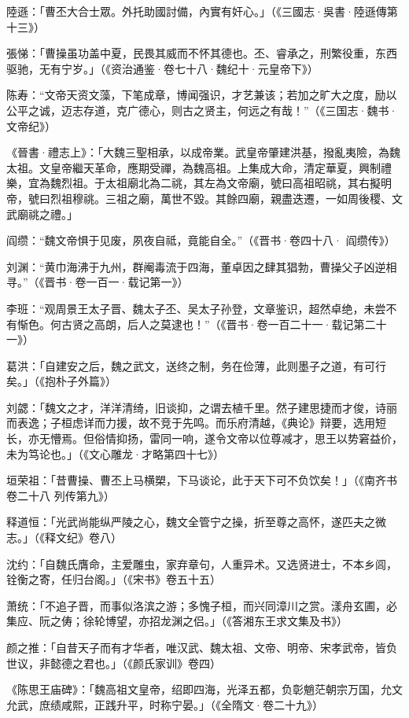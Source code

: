 陸遜：「曹丕大合士眾。外托助國討備，內實有奸心。」（《三國志·吳書·陸遜傳第十三》）

張悌：「曹操虽功盖中夏，民畏其威而不怀其德也。丕、睿承之，刑繁役重，东西驱驰，无有宁岁。」（《资治通鉴·卷七十八·魏纪十·元皇帝下》）

陈寿：“文帝天资文藻，下笔成章，博闻强识，才艺兼该；若加之旷大之度，励以公平之诚，迈志存道，克广德心，则古之贤主，何远之有哉！”（《三国志·魏书·文帝纪》）

《晉書·禮志上》：「大魏三聖相承，以成帝業。武皇帝肇建洪基，撥亂夷險，為魏太祖。文皇帝繼天革命，應期受禪，為魏高祖。上集成大命，清定華夏，興制禮樂，宜為魏烈祖。于太祖廟北為二祧，其左為文帝廟，號曰高祖昭祧，其右擬明帝，號曰烈祖穆祧。三祖之廟，萬世不毀。其餘四廟，親盡迭遷，一如周後稷、文武廟祧之禮。」

阎缵：“魏文帝惧于见废，夙夜自祗，竟能自全。”（《晋书·卷四十八· 阎缵传》）

刘渊：“黄巾海沸于九州，群阉毒流于四海，董卓因之肆其猖勃，曹操父子凶逆相寻。”（《晋书·卷一百一·载记第一》）

李班：“观周景王太子晋、魏太子丕、吴太子孙登，文章鉴识，超然卓绝，未尝不有惭色。何古贤之高朗，后人之莫逮也！”（《晋书·卷一百二十一·载记第二十一》）

葛洪：「自建安之后，魏之武文，送终之制，务在俭薄，此则墨子之道，有可行矣。」（《抱朴子外篇》）

刘勰：「魏文之才，洋洋清绮，旧谈抑，之谓去植千里。然子建思捷而才俊，诗丽而表逸；子桓虑详而力援，故不竞于先鸣。而乐府清越，《典论》辩要，选用短长，亦无懵焉。但俗情抑扬，雷同一响，遂令文帝以位尊减才，思王以势窘益价，未为笃论也。」（《文心雕龙·才略第四十七》）

垣荣祖：「昔曹操、曹丕上马横槊，下马谈论，此于天下可不负饮矣！」（《南齐书 卷二十八 列传第九》）

释道恒：「光武尚能纵严陵之心，魏文全管宁之操，折至尊之高怀，遂匹夫之微志。」（《释文纪》卷八）

沈约：「自魏氏膺命，主爱雕虫，家弃章句，人重异术。又选贤进士，不本乡闾，铨衡之寄，任归台阁。」（《宋书》卷五十五）

萧统：「不追子晋，而事似洛滨之游；多愧子桓，而兴同漳川之赏。漾舟玄圃，必集应、阮之俦；徐轮博望，亦招龙渊之侣。」（《答湘东王求文集及书》）

颜之推：「自昔天子而有才华者，唯汉武、魏太祖、文帝、明帝、宋孝武帝，皆负世议，非懿德之君也。」（《颜氏家训》卷四）

《陈思王庙碑》：「魏高祖文皇帝，绍即四海，光泽五都，负彰魈茫朝宗万国，允文允武，庶绩咸熙，正践升平，时称宁晏。」（《全隋文·卷二十九》）

